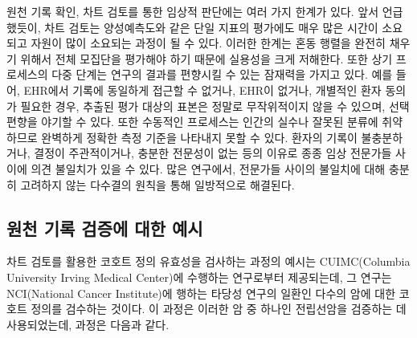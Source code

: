 \documentclass[11pt]{book}
\theoremstyle{definition}
\theoremstyle{definition}
\theoremstyle{definition}
\theoremstyle{remark}
\begin{document}
원천 기록 확인, 차트 검토를 통한 임상적 판단에는 여러 가지 한계가 있다.
앞서 언급했듯이, 차트 검토는 양성예측도와 같은 단일 지표의 평가에도 매우
많은 시간이 소요되고 자원이 많이 소요되는 과정이 될 수 있다. 이러한
한계는 혼동 행렬을 완전히 채우기 위해서 전체 모집단을 평가해야 하기
때문에 실용성을 크게 저해한다. 또한 상기 프로세스의 다중 단계는 연구의
결과를 편향시킬 수 있는 잠재력을 가지고 있다. 예를 들어, EHR에서 기록에
동일하게 접근할 수 없거나, EHR이 없거나, 개별적인 환자 동의가 필요한
경우, 추출된 평가 대상의 표본은 정말로 무작위적이지 않을 수 있으며, 선택
편향을 야기할 수 있다. 또한 수동적인 프로세스는 인간의 실수나 잘못된
분류에 취약하므로 완벽하게 정확한 측정 기준을 나타내지 못할 수 있다.
환자의 기록이 불충분하거나, 결정이 주관적이거나, 충분한 전문성이 없는
등의 이유로 종종 임상 전문가들 사이에 의견 불일치가 있을 수 있다. 많은
연구에서, 전문가들 사이의 불일치에 대해 충분히 고려하지 않는 다수결의
원칙을 통해 일방적으로 해결된다.

\subsection{원천 기록 검증에 대한 예시}\label{----}

차트 검토를 활용한 코호트 정의 유효성을 검사하는 과정의 예시는
CUIMC(Columbia University Irving Medical Center)에 수행하는 연구로부터
제공되는데, 그 연구는 NCI(National Cancer Institute)에 행하는 타당성
연구의 일환인 다수의 암에 대한 코호트 정의를 검수하는 것이다. 이 과정은
이러한 암 중 하나인 전립선암을 검증하는 데 사용되었는데, 과정은 다음과
같다.
\end{document}
